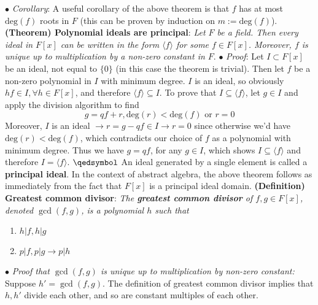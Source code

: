 \documentclass{article}
\begin{document}
\newline
\indent $ \bullet $ \textit{Corollary}: A useful corollary of the above theorem is that $ f $ has at most $ \text{deg}(f) $ roots in $ F $ (this can be proven by induction on $ m := \text{deg}(f) $).
\newline \newline
\textbf{(Theorem) Polynomial ideals are principal}: \textit{Let $ F $ be a field. Then every ideal in $ F[x] $ can be written in the form $ \langle f \rangle $ for some $f \in F[x] $. Moreover, $ f $ is unique up to multiplication by a non-zero constant in $ F $}.
\newline
\indent $ \bullet $ \textit{Proof}: Let $ I \subset F[x] $ be an ideal, not equal to $ \{ 0 \} $ (in this case the theorem is trivial). Then let $ f $ be a non-zero polynomial in $ I $ with minimum degree. $ I $ is an ideal, so obviously $ h f \in I, \forall h \in F[x] $, and therefore $ \langle f \rangle \subseteq I $. To prove that $ I \subseteq \langle f \rangle $, let $ g \in I $ and apply the division algorithm to find
$$ g = q f + r, \text{deg}(r) < \text{deg}(f) \text{ or } r = 0 $$
Moreover, $ I $ is an ideal $ \rightarrow r = g - qf \in I \rightarrow r = 0 $ since otherwise we'd have $ \text{deg}(r) < \text{deg}(f) $, which contradicts our choice of $ f $ as a polynomial with minimum degree. Thus we have $ g = q f $, for any $ g \in I $, which shows $ I \subseteq \langle f \rangle $ and therefore $ I = \langle f \rangle $. $ \qedsymbol $
\newline
An ideal generated by a single element is called a \textbf{principal ideal}. In the context of abstract algebra, the above theorem follows as immediately from the fact that $ F[x] $ is a principal ideal domain.
\newline \newline
\textbf{(Definition) Greatest common divisor}: \textit{The \textbf{greatest common divisor} of $ f, g \in F[x] $, denoted $ \gcd(f, g) $, is a polynomial $ h $ such that}
\begin{enumerate}
	\item \textit{$ h | f, h | g $}
	\item \textit{$ p | f, p | g \rightarrow p | h $}
\end{enumerate}
\indent $ \bullet $ \textit{Proof that $ \gcd(f, g) $ is unique up to multiplication by non-zero constant:} Suppose $ h' = \gcd(f, g) $. The definition of greatest common divisor implies that $ h, h' $ divide each other, and so are constant multiples of each other.
\newline \newline
\end{document}
